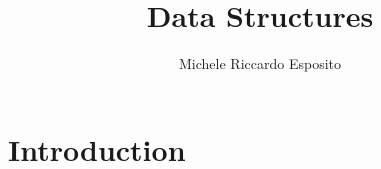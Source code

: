 \documentclass[a4paper]{report}
\begin{document}
\title{Data Structures}
\author{Michele Riccardo Esposito}
\maketitle

\setcounter{page}{2}
\tableofcontents


\chapter{Introduction}


\end{document}
